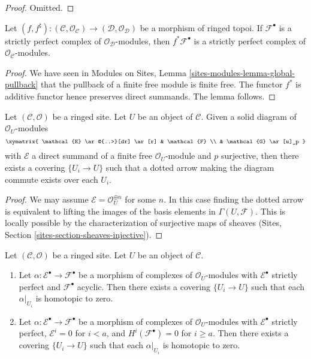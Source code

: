 \begin{proof}
Omitted.
\end{proof}

\begin{lemma}
\label{lemma-strictly-perfect-pullback}
Let $(f, f^\sharp) : (\mathcal{C}, \mathcal{O}_\mathcal{C}) \to
(\mathcal{D}, \mathcal{O}_\mathcal{D})$
be a morphism of ringed topoi. If $\mathcal{F}^\bullet$ is a strictly
perfect complex of $\mathcal{O}_\mathcal{D}$-modules, then
$f^*\mathcal{F}^\bullet$ is a strictly perfect complex of
$\mathcal{O}_\mathcal{C}$-modules.
\end{lemma}

\begin{proof}
We have seen in
Modules on Sites, Lemma \ref{sites-modules-lemma-global-pullback}
that the pullback of a finite free module is finite free. The functor
$f^*$ is additive functor hence preserves direct summands. The lemma follows.
\end{proof}

\begin{lemma}
\label{lemma-local-lift-map}
Let $(\mathcal{C}, \mathcal{O})$ be a ringed site. Let $U$ be an object of
$\mathcal{C}$. Given a solid diagram of $\mathcal{O}_U$-modules
$$
\xymatrix{
\mathcal{E} \ar@{..>}[dr] \ar[r] & \mathcal{F} \\
& \mathcal{G} \ar[u]_p
}
$$
with $\mathcal{E}$ a direct summand of a finite free
$\mathcal{O}_U$-module and $p$ surjective, then there exists a
covering $\{U_i \to U\}$ such that a dotted arrow
making the diagram commute exists over each $U_i$.
\end{lemma}

\begin{proof}
We may assume $\mathcal{E} = \mathcal{O}_U^{\oplus n}$ for some $n$.
In this case finding the dotted arrow is equivalent to lifting the
images of the basis elements in $\Gamma(U, \mathcal{F})$. This is
locally possible by the characterization of surjective maps of
sheaves (Sites, Section \ref{sites-section-sheaves-injective}).
\end{proof}

\begin{lemma}
\label{lemma-local-homotopy}
Let $(\mathcal{C}, \mathcal{O})$ be a ringed site. Let $U$ be an object
of $\mathcal{C}$.
\begin{enumerate}
\item Let $\alpha : \mathcal{E}^\bullet \to \mathcal{F}^\bullet$
be a morphism of complexes of $\mathcal{O}_U$-modules
with $\mathcal{E}^\bullet$ strictly perfect and $\mathcal{F}^\bullet$
acyclic. Then there exists a covering $\{U_i \to U\}$ such that each
$\alpha|_{U_i}$ is homotopic to zero.
\item Let $\alpha : \mathcal{E}^\bullet \to \mathcal{F}^\bullet$
be a morphism of complexes of $\mathcal{O}_U$-modules
with $\mathcal{E}^\bullet$ strictly perfect, $\mathcal{E}^i = 0$
for $i < a$, and $H^i(\mathcal{F}^\bullet) = 0$ for $i \geq a$.
Then there exists a covering $\{U_i \to U\}$ such that each
$\alpha|_{U_i}$ is homotopic to zero.
\end{enumerate}
\end{lemma}

